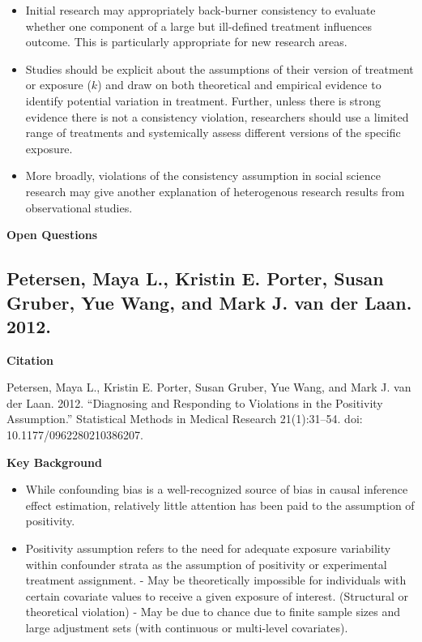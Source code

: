 \documentclass[
]{book}
\providecommand{\tightlist}{%
  \setlength{\itemsep}{0pt}\setlength{\parskip}{0pt}}
\begin{document}
\begin{itemize}
\tightlist
\item
  Initial research may appropriately back-burner consistency to evaluate whether one component of a large but ill-defined treatment influences outcome. This is particularly appropriate for new research areas.
\item
  Studies should be explicit about the assumptions of their version of treatment or exposure (\(k\)) and draw on both theoretical and empirical evidence to identify potential variation in treatment. Further, unless there is strong evidence there is not a consistency violation, researchers should use a limited range of treatments and systemically assess different versions of the specific exposure.
\item
  More broadly, violations of the consistency assumption in social science research may give another explanation of heterogenous research results from observational studies.
\end{itemize}

\textbf{Open Questions}

\hypertarget{petersen-maya-l.-kristin-e.-porter-susan-gruber-yue-wang-and-mark-j.-van-der-laan.-2012.}{%
\subsection{Petersen, Maya L., Kristin E. Porter, Susan Gruber, Yue Wang, and Mark J. van der Laan. 2012.}\label{petersen-maya-l.-kristin-e.-porter-susan-gruber-yue-wang-and-mark-j.-van-der-laan.-2012.}}

\textbf{Citation }

Petersen, Maya L., Kristin E. Porter, Susan Gruber, Yue Wang, and Mark J. van der Laan. 2012. ``Diagnosing and Responding to Violations in the Positivity Assumption.'' Statistical Methods in Medical Research 21(1):31--54. doi: 10.1177/0962280210386207.

\textbf{Key Background}

\begin{itemize}
\tightlist
\item
  While confounding bias is a well-recognized source of bias in causal inference effect estimation, relatively little attention has been paid to the assumption of positivity.
\item
  Positivity assumption refers to the need for adequate exposure variability within confounder strata as the assumption of positivity or experimental treatment assignment.
  - May be theoretically impossible for individuals with certain covariate values to receive a given exposure of interest. (Structural or theoretical violation)
  - May be due to chance due to finite sample sizes and large adjustment sets (with continuous or multi-level covariates).
\end{itemize}
\end{document}
